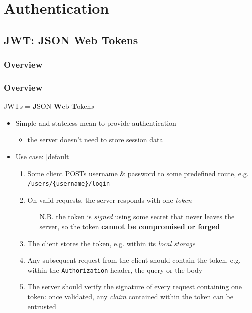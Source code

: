 \section{Authentication}

\subsection{JWT: JSON Web Tokens}

\subsubsection{Overview}

\begin{frame}[allowframebreaks]
	\frametitle{Overview}
	
	\begin{block}{JWT\emph{s} = \textbf{J}SON \textbf{W}eb \textbf{T}oken\emph{s}}
		\begin{itemize}
			\item Simple and stateless mean to provide authentication
			\begin{itemize}
				\item the server doesn't need to store session data
			\end{itemize}
			\item Use case:
			\begin{enumerate}
				\item Some client POSTs username \& password to some predefined route, e.g. \texttt{/users/\{username\}/login}
				\item On valid requests, the server responds with one \emph{token}
				\begin{itemize}
					\item[N.B.] the token is \emph{signed} using some secret that never leaves the server, so the token \textbf{cannot be compromised or forged}
				\end{itemize}
				\item The client stores the token, e.g. within its \emph{local storage}
				\item Any subsequent request from the client should contain the token, e.g. within the \texttt{Authorization} header, the query or the body
				\item The server should verify the signature of every request containing one token: once validated, any \emph{claim} contained within the token can be entrusted
			\end{enumerate}
		\end{itemize}
		

\end{block}
\end{frame}
